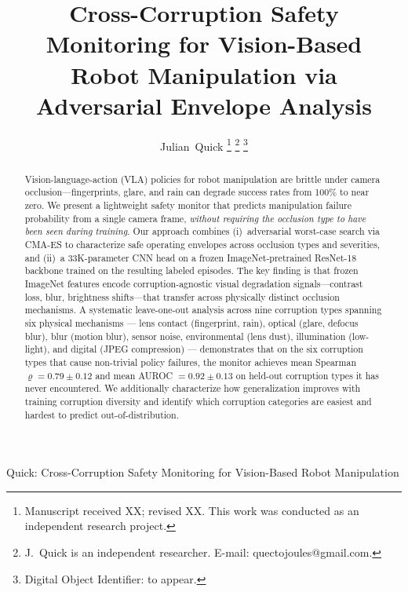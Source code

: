 \documentclass[letterpaper]{IEEEtran}
\renewcommand{\rho}{\varrho}
\begin{document}
\title{Cross-Corruption Safety Monitoring for Vision-Based\\Robot Manipulation via Adversarial Envelope Analysis}

\author{Julian~Quick%
\thanks{Manuscript received XX; revised XX. This work was conducted as an independent research project.}%
\thanks{J.~Quick is an independent researcher. E-mail: quectojoules@gmail.com.}%
\thanks{Digital Object Identifier: to appear.}%
}

%
{Quick: Cross-Corruption Safety Monitoring for Vision-Based Robot Manipulation}

\maketitle

\begin{abstract}
Vision-language-action (VLA) policies for robot manipulation are brittle under camera occlusion---fingerprints, glare, and rain can degrade success rates from 100\% to near zero.
We present a lightweight safety monitor that predicts manipulation failure probability from a single camera frame, \emph{without requiring the occlusion type to have been seen during training}.
Our approach combines (i)~adversarial worst-case search via CMA-ES to characterize safe operating envelopes across occlusion types and severities, and (ii)~a 33K-parameter CNN head on a frozen ImageNet-pretrained ResNet-18 backbone trained on the resulting labeled episodes.
The key finding is that frozen ImageNet features encode corruption-agnostic visual degradation signals---contrast loss, blur, brightness shifts---that transfer across physically distinct occlusion mechanisms.
A systematic leave-one-out analysis across nine corruption types spanning six physical mechanisms --- lens contact (fingerprint, rain), optical (glare, defocus blur), blur (motion blur), sensor noise, environmental (lens dust), illumination (low-light), and digital (JPEG compression) --- demonstrates that on the six corruption types that cause non-trivial policy failures, the monitor achieves mean Spearman $\rho = 0.79 \pm 0.12$ and mean AUROC $= 0.92 \pm 0.13$ on held-out corruption types it has never encountered.
We additionally characterize how generalization improves with training corruption diversity and identify which corruption categories are easiest and hardest to predict out-of-distribution.
\end{abstract}
\end{document}
